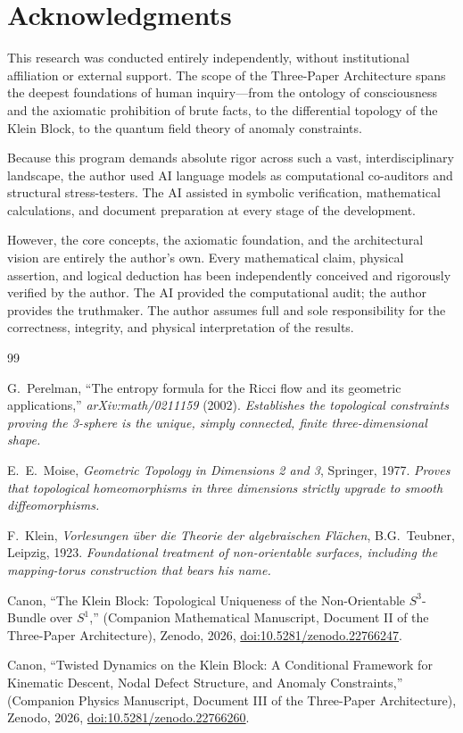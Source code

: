 \documentclass[11pt]{article}
\theoremstyle{canonstyle}
\newcommand{\CanonBibliographySetup}{%
  \small
  \setlength{\parskip}{0.22em}
  \setlength{\itemsep}{0.55em}
}
\begin{document}
\section*{Acknowledgments}
This research was conducted entirely independently, without institutional affiliation or external support. The scope of the Three-Paper Architecture spans the deepest foundations of human inquiry---from the ontology of consciousness and the axiomatic prohibition of brute facts, to the differential topology of the Klein Block, to the quantum field theory of anomaly constraints. 

Because this program demands absolute rigor across such a vast, interdisciplinary landscape, the author used AI language models as computational co-auditors and structural stress-testers. The AI assisted in symbolic verification, mathematical calculations, and document preparation at every stage of the development.

However, the core concepts, the axiomatic foundation, and the architectural vision are entirely the author's own. Every mathematical claim, physical assertion, and logical deduction has been independently conceived and rigorously verified by the author. The AI provided the computational audit; the author provides the truthmaker. The author assumes full and sole responsibility for the correctness, integrity, and physical interpretation of the results.

{}
\begin{thebibliography}{99}
\CanonBibliographySetup

G.~Perelman, ``The entropy formula for the Ricci flow and its geometric applications,'' \textit{arXiv:math/0211159} (2002).
\textit{Establishes the topological constraints proving the 3-sphere is the unique, simply connected, finite three-dimensional shape.}

E.~E.~Moise, \textit{Geometric Topology in Dimensions 2 and 3}, Springer, 1977.
\textit{Proves that topological homeomorphisms in three dimensions strictly upgrade to smooth diffeomorphisms.}

F.~Klein, \textit{Vorlesungen über die Theorie der algebraischen Flächen}, B.G.~Teubner, Leipzig, 1923.
\textit{Foundational treatment of non-orientable surfaces, including the mapping-torus construction that bears his name.}

Canon, ``The Klein Block: Topological Uniqueness of the Non-Orientable $S^3$-Bundle over $S^1$,'' (Companion Mathematical Manuscript, Document II of the Three-Paper Architecture), Zenodo, 2026, \href{https://doi.org/10.5281/zenodo.22766247}{doi:10.5281/zenodo.22766247}.

Canon, ``Twisted Dynamics on the Klein Block: A Conditional Framework for Kinematic Descent, Nodal Defect Structure, and Anomaly Constraints,'' (Companion Physics Manuscript, Document III of the Three-Paper Architecture), Zenodo, 2026, \href{https://doi.org/10.5281/zenodo.22766260}{doi:10.5281/zenodo.22766260}.

\end{thebibliography}
\end{document}
